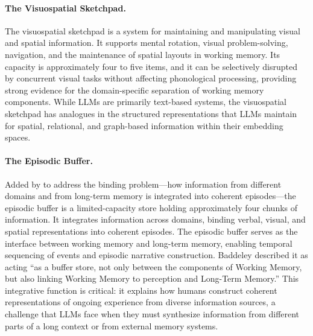 \documentclass[11pt,letterpaper]{article}
\begin{document}
\paragraph{The Visuospatial Sketchpad.} The visuospatial sketchpad is a system for maintaining and manipulating visual and spatial information. It supports mental rotation, visual problem-solving, navigation, and the maintenance of spatial layouts in working memory. Its capacity is approximately four to five items, and it can be selectively disrupted by concurrent visual tasks without affecting phonological processing, providing strong evidence for the domain-specific separation of working memory components. While LLMs are primarily text-based systems, the visuospatial sketchpad has analogues in the structured representations that LLMs maintain for spatial, relational, and graph-based information within their embedding spaces.

\paragraph{The Episodic Buffer.} Added by \cite{baddeley2000episodic} to address the binding problem---how information from different domains and from long-term memory is integrated into coherent episodes---the episodic buffer is a limited-capacity store holding approximately four chunks of information. It integrates information across domains, binding verbal, visual, and spatial representations into coherent episodes. The episodic buffer serves as the interface between working memory and long-term memory, enabling temporal sequencing of events and episodic narrative construction. Baddeley described it as acting ``as a buffer store, not only between the components of Working Memory, but also linking Working Memory to perception and Long-Term Memory.'' This integrative function is critical: it explains how humans construct coherent representations of ongoing experience from diverse information sources, a challenge that LLMs face when they must synthesize information from different parts of a long context or from external memory systems.
\end{document}
